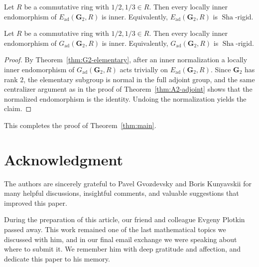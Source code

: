 \documentclass[]{jgcc}
\numberwithin{equation}{section}
\newcommand{\Sha}{\operatorname{Sha}}
\begin{document}
\begin{thm}\label{thm:G2-elementary}
Let $R$ be a commutative ring with $1/2,1/3\in R$.
Then every locally inner endomorphism of $E_{\mathrm{ad}}(\mathbf G_2,R)$ is inner.
Equivalently, $E_{\mathrm{ad}}(\mathbf G_2,R)$ is $\Sha$-rigid.
\end{thm}

\begin{thm}\label{thm:G2-adjoint}
Let $R$ be a commutative ring with $1/2,1/3\in R$.
Then every locally inner endomorphism of $G_{\mathrm{ad}}(\mathbf G_2,R)$ is inner.
Equivalently, $G_{\mathrm{ad}}(\mathbf G_2,R)$ is $\Sha$-rigid.
\end{thm}

\begin{proof}
By Theorem~\ref{thm:G2-elementary}, after an inner normalization a locally inner endomorphism of $G_{\mathrm{ad}}(\mathbf G_2,R)$
acts trivially on $E_{\mathrm{ad}}(\mathbf G_2,R)$.
Since $\mathbf G_2$ has rank $2$, the elementary subgroup is normal in the full adjoint group, and the same centralizer argument as in the proof of Theorem~\ref{thm:A2-adjoint} shows that the normalized endomorphism is the identity.
Undoing the normalization yields the claim.
\end{proof}

\medskip
This completes the proof of Theorem~\ref{thm:main}.

\section*{Acknowledgment}
The authors are sincerely grateful to Pavel Gvozdevsky and Boris Kunyavskii
for many helpful discussions, insightful comments, and valuable suggestions
that improved this paper.

During the preparation of this article, our friend and colleague Evgeny Plotkin
passed away. This work remained one of the last mathematical topics we discussed
with him, and in our final email exchange we were speaking about where to submit it.
We remember him with deep gratitude and affection, and dedicate this paper to his memory.



\end{document}
